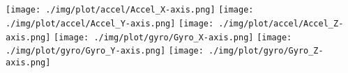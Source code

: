 \renewcommand{\thechapter}{\Alph{chapter}}
\renewcommand{\thefigure}{\Alph{chapter}.\arabic{figure}}
\renewcommand{\chaptername}{Appendix}

\setlength{\beforechapskip}{0pt}
\setlength{\afterchapskip}{0pt}
\setlength{\footskip}{5cm}

\clearpage
\chapter{}\label{apdx:A}
\setlrmarginsandblock{0.5cm}{0.5cm}{*}
\setulmarginsandblock{0.25cm}{0.25cm}{*}
\checkandfixthelayout
{
\centering\texttt{[image: ./img/plot/accel/Accel\_X-axis.png]}
\centering\texttt{[image: ./img/plot/accel/Accel\_Y-axis.png]}
\centering\texttt{[image: ./img/plot/accel/Accel\_Z-axis.png]}
\centering\texttt{[image: ./img/plot/gyro/Gyro\_X-axis.png]}
\centering\texttt{[image: ./img/plot/gyro/Gyro\_Y-axis.png]}
\centering\texttt{[image: ./img/plot/gyro/Gyro\_Z-axis.png]}
}
